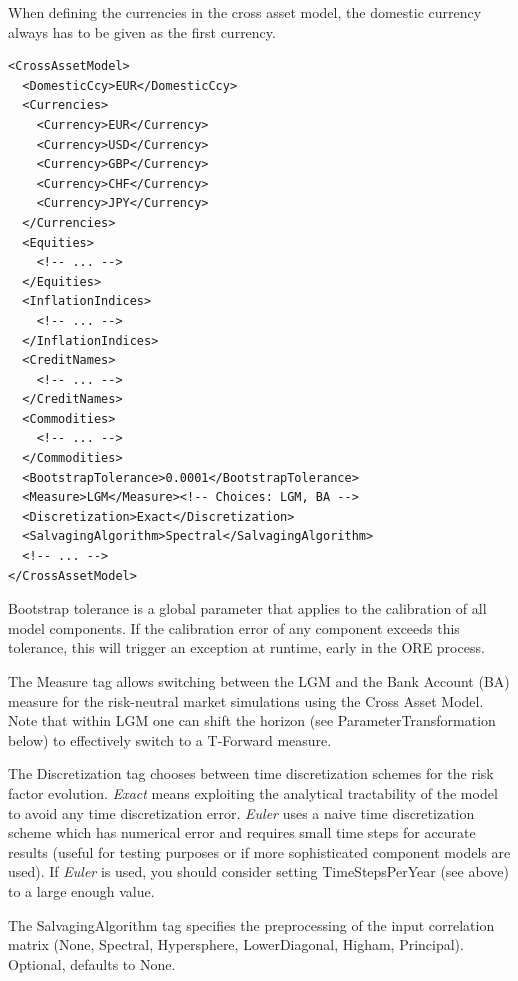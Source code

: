 When defining the currencies in the cross asset model, the domestic currency always has to be given as the first currency.

\begin{listing}[H]
\begin{verbatim}
<CrossAssetModel>
  <DomesticCcy>EUR</DomesticCcy>
  <Currencies>
    <Currency>EUR</Currency>
    <Currency>USD</Currency>
    <Currency>GBP</Currency>
    <Currency>CHF</Currency>
    <Currency>JPY</Currency>
  </Currencies>
  <Equities>
	<!-- ... -->
  </Equities>
  <InflationIndices>
	<!-- ... -->
  </InflationIndices>
  <CreditNames>
	<!-- ... -->
  </CreditNames>
  <Commodities>
	<!-- ... -->
  </Commodities>
  <BootstrapTolerance>0.0001</BootstrapTolerance>
  <Measure>LGM</Measure><!-- Choices: LGM, BA -->
  <Discretization>Exact</Discretization>
  <SalvagingAlgorithm>Spectral</SalvagingAlgorithm>
  <!-- ... -->
</CrossAssetModel>
\end{verbatim}
\caption{Simulation model currencies configuration}
\label{lst:simulation_model_currencies_configuration}
\end{listing}

Bootstrap tolerance is a global parameter that applies to the calibration of all model components. If the calibration
error of any component exceeds this tolerance, this will trigger an exception at runtime, early in the ORE process.

The Measure tag allows switching between the LGM and the Bank Account (BA) measure for the risk-neutral market simulations using the Cross Asset Model. Note that within LGM one can shift the horizon (see ParameterTransformation below) to effectively switch to a T-Forward measure.

The Discretization tag chooses between time discretization schemes for the risk factor evolution. {\em Exact} means
exploiting the analytical tractability of the model to avoid any time discretization error. {\em Euler} uses a naive
time discretization scheme which has numerical error and requires small time steps for accurate results (useful for
testing purposes or if more sophisticated component models are used). If {\em Euler} is used, you should consider
setting TimeStepsPerYear (see above) to a large enough value.

The SalvagingAlgorithm tag specifies the preprocessing of the input correlation matrix (None, Spectral, Hypersphere, LowerDiagonal, Higham, Principal). Optional, defaults to None.

